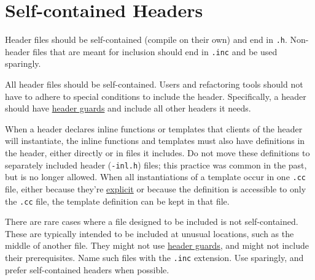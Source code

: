 
\section{Self-contained Headers}\label{sec:self-contained-headers}
Header files should be self-contained (compile on their own) and end in \texttt{.h}. Non-header files that are meant for inclusion should end in \texttt{.inc} and be used sparingly.

All header files should be self-contained. Users and refactoring tools should not have to adhere to special conditions to include the header. Specifically, a header should have \hyperref[sec:the-define-guard]{header guards} and include all other headers it needs.

When a header declares inline functions or templates that clients of the header will instantiate, the inline functions and templates must also have definitions in the header, either directly or in files it includes. Do not move these definitions to separately included header (\texttt{-inl.h}) files; this practice was common in the past, but is no longer allowed. When all instantiations of a template occur in one \texttt{.cc} file, either because they're \href{https://en.cppreference.com/w/cpp/language/class_template#Explicit_instantiation}{explicit} or because the definition is accessible to only the \texttt{.cc} file, the template definition can be kept in that file.

There are rare cases where a file designed to be included is not self-contained. These are typically intended to be included at unusual locations, such as the middle of another file. They might not use \hyperref[sec:the-define-guard]{header guards}, and might not include their prerequisites. Name such files with the \texttt{.inc} extension. Use sparingly, and prefer self-contained headers when possible.